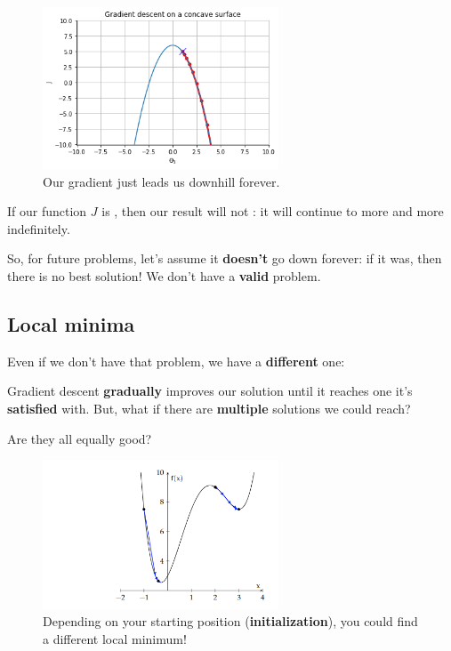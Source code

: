         \begin{figure}[H]
        \centering
            \includegraphics[width=70mm,scale=0.5]{images/gradient_descent_images/gradient_descent_on_a_concave_surface.png}
        
        \caption*{Our gradient just leads us downhill forever.}
        \end{figure}
        
        \begin{concept}
            If our function $J$ is , then our result will not : it will continue to  more and more indefinitely.
        \end{concept}
        
        So, for future problems, let's assume it \textbf{doesn't} go down forever: if it was, then there is no best solution! We don't have a \textbf{valid} problem.
        
    \subsection{Local minima}
        
        Even if we don't have that problem, we have a \textbf{different} one:
        
        Gradient descent \textbf{gradually} improves our solution until it reaches one it's \textbf{satisfied} with. But, what if there are \textbf{multiple} solutions we could reach?
        
        Are they all equally good?
        
        \begin{figure}[H]
        \centering
            \includegraphics[width=70mm,scale=0.5]{images/gradient_descent_images/Two_Local_Minima.png}
        
        \caption*{Depending on your starting position (\textbf{initialization}), you could find a different local minimum!}
        \end{figure}
        

